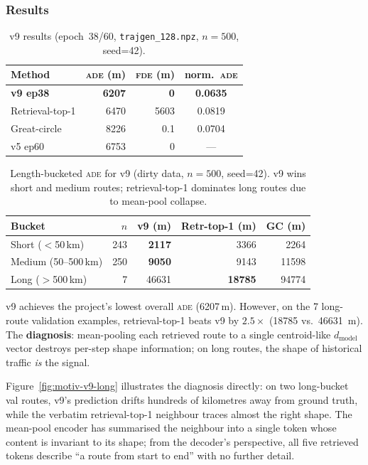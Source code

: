 \documentclass[11pt,a4paper]{article}
\newcommand{\ade}{\textsc{ade}}
\newcommand{\fde}{\textsc{fde}}
\begin{document}
\subsubsection{Results}

\begin{table}[ht]
\centering
\caption{v9 results (epoch~38/60, \texttt{trajgen\_128.npz}, $n=500$, seed=42).}
\label{tab:v9}
\begin{tabular}{lrrc}
\toprule
Method & \ade{} (m) & \fde{} (m) & norm.\ \ade{} \\
\midrule
\textbf{v9 ep38}           & \textbf{6207} & \textbf{0}  & \textbf{0.0635} \\
Retrieval-top-1            & 6470          & 5603        & 0.0819 \\
Great-circle               & 8226          & 0.1         & 0.0704 \\
v5 ep60                    & 6753          & 0           & ---    \\
\bottomrule
\end{tabular}
\end{table}

\begin{table}[ht]
\centering
\caption{Length-bucketed \ade{} for v9 (dirty data, $n=500$, seed=42).
         v9 wins short and medium routes; retrieval-top-1 dominates long routes
         due to mean-pool collapse.}
\label{tab:v9-buckets}
\begin{tabular}{lrrrr}
\toprule
Bucket & $n$ & v9 (m) & Retr-top-1 (m) & GC (m) \\
\midrule
Short ($<$50\,km)     & 243 & \textbf{2117}  & 3366  & 2264  \\
Medium (50--500\,km) & 250 & \textbf{9050} & 9143 & 11598 \\
Long ($>$500\,km)     &   7 & 46631         & \textbf{18785} & 94774 \\
\bottomrule
\end{tabular}
\end{table}

v9 achieves the project's lowest overall \ade{} (6207\,m).
However, on the 7 long-route validation examples, retrieval-top-1 beats v9 by
$2.5\times$ (18785 vs.\ 46631~m).
The \textbf{diagnosis}: mean-pooling each retrieved route to a single centroid-like
$d_\text{model}$ vector destroys per-step shape information; on long routes,
the shape of historical traffic \emph{is} the signal.

Figure~\ref{fig:motiv-v9-long} illustrates the diagnosis directly:
on two long-bucket val routes, v9's prediction drifts hundreds of kilometres
away from ground truth, while the verbatim retrieval-top-1 neighbour traces
almost the right shape.
The mean-pool encoder has summarised the neighbour into a single token whose
content is invariant to its shape; from the decoder's perspective, all five
retrieved tokens describe ``a route from start to end'' with no further detail.
\end{document}
